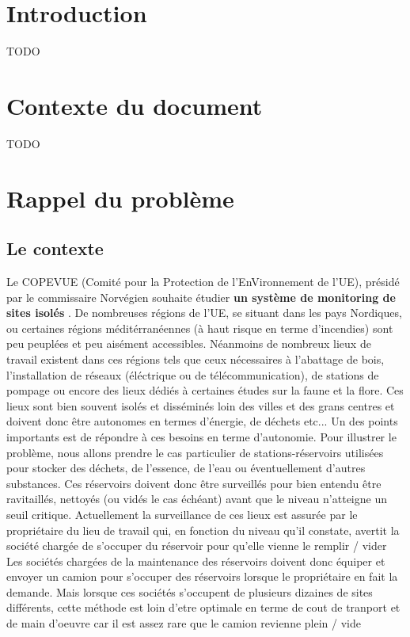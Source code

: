 \section{Introduction}
TODO
\section{Contexte du document}
TODO
\section{Rappel du problème}
\subsection{Le contexte}
Le COPEVUE (Comité pour la Protection de l'EnVironnement de l'UE), présidé par le commissaire Norvégien souhaite étudier \textbf {un système
de monitoring de sites isolés} .
De nombreuses régions de l'UE, se situant dans les pays Nordiques, ou certaines régions méditérranéennes (à haut risque en terme d'incendies) sont peu peuplées et peu aisément accessibles. Néanmoins
de nombreux lieux de travail existent dans ces régions tels que ceux nécessaires à l'abattage de bois, l'installation de réseaux (éléctrique ou de télécommunication),
de stations de pompage ou encore des lieux dédiés à certaines études sur la faune et la flore. Ces lieux sont bien souvent isolés et disséminés loin des villes et des grans centres et doivent donc être autonomes en termes 
d'énergie, de déchets etc...
Un des points importants est de répondre à ces besoins en terme d'autonomie.
Pour illustrer le problème, nous allons prendre le cas particulier de stations-réservoirs utilisées pour stocker des déchets, de l'essence, de l'eau ou éventuellement d'autres substances. Ces réservoirs doivent donc être
surveillés pour bien entendu être ravitaillés, nettoyés (ou vidés le cas échéant) avant que le niveau n'atteigne un seuil critique. Actuellement la surveillance de ces lieux est assurée par le propriétaire du lieu de travail qui, en fonction du niveau qu'il constate, avertit la société chargée de s'occuper du réservoir pour qu'elle vienne le remplir / vider
Les sociétés chargées de la maintenance des réservoirs doivent donc équiper et envoyer un camion pour s'occuper des réservoirs lorsque le propriétaire en fait la demande. Mais lorsque ces sociétés s'occupent de plusieurs dizaines de sites différents, cette méthode est loin d'etre optimale en terme de cout de tranport et de main d'oeuvre car il est assez rare que le camion revienne plein / vide
